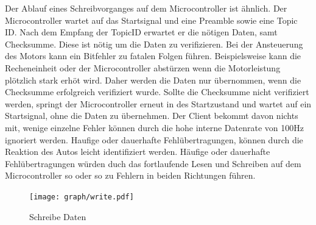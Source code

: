 Der Ablauf eines Schreibvorganges auf dem Microcontroller ist ähnlich. Der Microcontroller wartet auf das Startsignal und eine Preamble sowie eine Topic ID.
Nach dem Empfang der TopicID erwartet er die nötigen Daten, samt Checksumme. Diese ist nötig um die Daten zu verifizieren. Bei der Ansteuerung des Motors kann ein
Bitfehler zu fatalen Folgen führen. Beispielsweise kann die Recheneinheit oder der Microcontroller abstürzen wenn die Motorleistung plötzlich stark erhöt wird.
Daher werden die Daten nur übernommen, wenn die Checksumme erfolgreich verifiziert wurde. Sollte die Checksumme nicht verifiziert werden, springt der Microcontroller
erneut in des Startzustand und wartet auf ein Startsignal, ohne die Daten zu übernehmen. Der Client bekommt davon nichts mit, wenige einzelne Fehler können durch die
hohe interne Datenrate von 100Hz ignoriert werden. Haufige oder dauerhafte Fehlübertragungen, können durch die Reaktion des Autos leicht identifiziert werden.
Häufige oder dauerhafte Fehlübertragungen würden duch das fortlaufende Lesen und Schreiben auf dem Microcontroller so oder so zu Fehlern in beiden Richtungen führen.

\begin{figure}[ht]
\centering
\texttt{[image: graph/write.pdf]} 
\caption{Schreibe Daten}
\label{fig:uC_write}
\end{figure}





